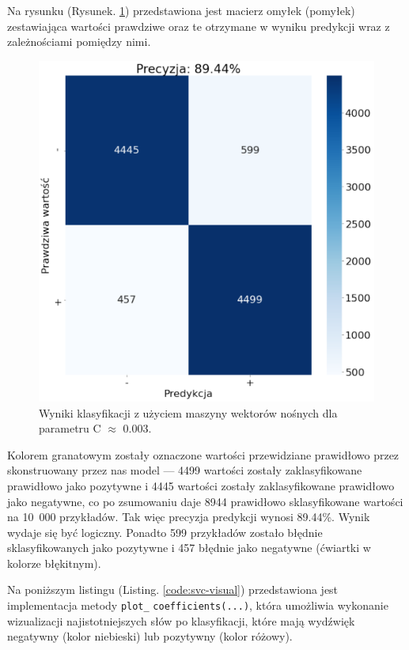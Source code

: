 \noindent Na rysunku (Rysunek. \ref{fig:macierz-svc}) przedstawiona jest macierz omyłek (pomyłek) zestawiająca wartości prawdziwe oraz te otrzymane w wyniku predykcji wraz z zależnościami pomiędzy nimi.

\begin{figure}[H]
	\centering
	\includegraphics[width=0.5\linewidth]{images/chapter3/svc-macierz.pdf}
	\caption{Wyniki klasyfikacji z użyciem maszyny wektorów nośnych dla parametru C $\approx$ 0.003.}
	\label{fig:macierz-svc}
\end{figure}

\noindent Kolorem granatowym zostały oznaczone wartości przewidziane prawidłowo przez skonstruowany przez nas model --- 4499 wartości zostały zaklasyfikowane prawidłowo jako pozytywne i 4445 wartości zostały zaklasyfikowane prawidłowo jako negatywne, co po zsumowaniu daje 8944 prawidłowo sklasyfikowane wartości na 10~000 przykładów. Tak więc precyzja predykcji wynosi 89.44\%. Wynik wydaje się być logiczny. Ponadto 599 przykładów zostało błędnie sklasyfikowanych jako pozytywne i 457 błędnie jako negatywne (ćwiartki w kolorze błękitnym).

\noindent Na poniższym listingu (Listing. \ref{code:svc-visual}) przedstawiona jest implementacja metody \verb|plot_| \verb|coefficients(...)|, która umożliwia wykonanie wizualizacji najistotniejszych słów po klasyfikacji, które mają wydźwięk negatywny (kolor niebieski) lub pozytywny (kolor różowy).

